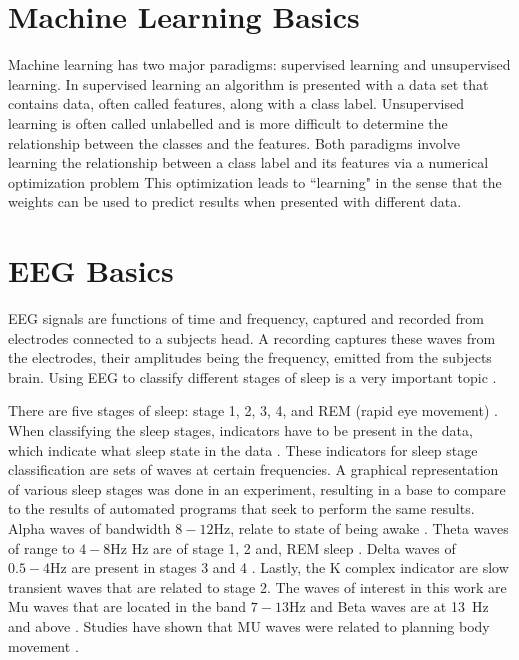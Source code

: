 \documentclass[conference,compsoc]{IEEEtran}
\begin{document}
\section{Machine Learning Basics}
Machine learning has two major paradigms: supervised learning and unsupervised learning.  In supervised learning an algorithm is presented with a data set that contains data, often called features, along with a class label.  Unsupervised learning is often called unlabelled and is more difficult to determine the relationship between the classes and the features.  Both paradigms involve learning the relationship between a class label and its features via a numerical optimization problem  
This optimization leads to ``learning" in the sense that the weights can be used to predict results when presented with different data. %


\section{EEG Basics}
EEG signals are functions of time and frequency, captured and recorded from electrodes connected to a subjects head. A recording captures these waves from the electrodes, their amplitudes being the frequency, emitted from the subjects brain.  
Using EEG to classify different stages of sleep is a very important topic \cite{auto}.

There are five stages of sleep:  stage 1, 2, 3, 4, and REM (rapid eye movement) \cite{sleep}. When classifying the sleep stages, indicators 
have to be present in the data, which indicate what sleep state in the data \cite{auto}. These indicators for sleep stage classification are sets of waves at certain frequencies. A graphical representation of various sleep stages was done in an experiment, resulting in a base to compare to the results of automated programs that seek to perform the same results. Alpha waves of bandwidth $8-12\si{\hertz}$, relate to state of being awake \cite{auto}. Theta waves of range to $4-8\si{\hertz}$ Hz are of stage 1, 2 and, REM sleep \cite{auto}.  Delta waves of $0.5-4\si{\hertz}$ are present in stages 3 and 4 \cite{auto}. Lastly, the K complex indicator are slow transient waves that are related to stage 2.  The waves of interest in this work are Mu waves that are located in the band $7 - 13\si{\hertz}$ and Beta waves are at \SI{13}{\hertz} and above \cite{classsvm}. Studies have shown that MU waves were related to planning body movement \cite{classsvm}.
\end{document}
